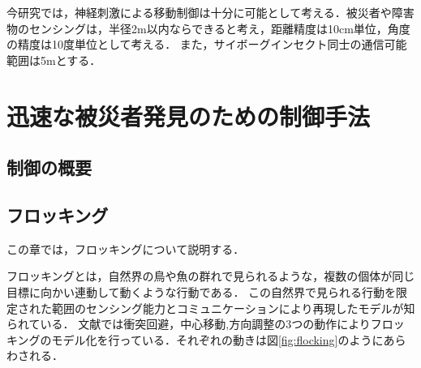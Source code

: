 \documentclass[a4paper,11pt]{jarticle}
\begin{document}
	今研究では，神経刺激による移動制御は十分に可能として考える．被災者や障害物のセンシングは，半径2m以内ならできると考え，距離精度は10cm単位，角度の精度は10度単位として考える．
	また，サイボーグインセクト同士の通信可能範囲は5mとする．
	
	\section{迅速な被災者発見のための制御手法}
	\subsection{制御の概要}
	\subsection{フロッキング}
	\label{sec:flocking}
	この章では，フロッキングについて説明する．
	
	フロッキングとは，自然界の鳥や魚の群れで見られるような，複数の個体が同じ目標に向かい連動して動くような行動である．
	この自然界で見られる行動を限定された範囲のセンシング能力とコミュニケーションにより再現したモデルが知られている．
	文献\cite{steering}では衝突回避，中心移動,方向調整の3つの動作によりフロッキングのモデル化を行っている．それぞれの動きは図\ref{fig:flocking}のようにあらわされる．
	
\end{document}
